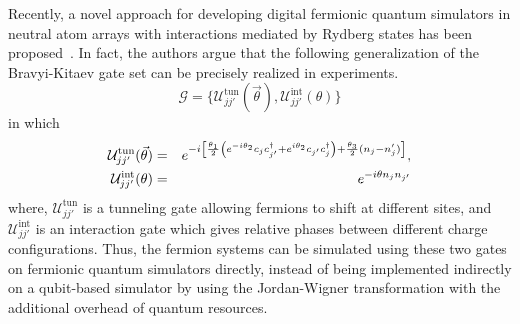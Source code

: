 \documentclass[aps, pra, reprint, superscriptaddress]{revtex4-1}
\begin{document}
Recently, a novel approach for developing digital fermionic quantum simulators in neutral atom arrays with interactions mediated by Rydberg states  has been proposed~\cite{gonzalez2023fermionic}. In fact, the authors argue that the following generalization of the Bravyi-Kitaev gate set can be precisely realized in experiments. 
\begin{equation}
\mathcal{G} = \lbrace \mathcal{U}_{jj'}^{\text{tun}} (\vec{\theta}), \mathcal{U}_{jj'}^{\text{int}} (\theta) \rbrace
\end{equation}
in which
\begin{eqnarray}
    \mathcal{U}_{jj'}^{\text{tun}} (\vec{\theta}) &=& e^{-i \left[ \frac{\theta_1}{2}\left( e^{-i\theta_2} c_{j} c_{j'}^{\dagger}+ e^{i\theta_2} c_{j'} c_{j}^{\dagger} \right) + \frac{\theta_3}{2} (n_j - n_j') \right]}, \cr
    \mathcal{U}_{jj'}^{\text{int}} (\theta) &=& e^{-i\theta n_{j} n_{j'}}
    \label{eq:gen_bk}
\end{eqnarray}
where, $\mathcal{U}_{jj'}^{\text{tun}}$ is a tunneling gate allowing fermions to shift at different sites, and $\mathcal{U}_{jj'}^{\text{int}}$ is an interaction gate which
gives relative phases between different charge configurations.  
Thus, the fermion systems can be simulated using these two gates on fermionic quantum simulators directly, instead of being implemented indirectly on a qubit-based simulator by using the Jordan-Wigner transformation with the additional overhead of quantum resources. 
\end{document}
